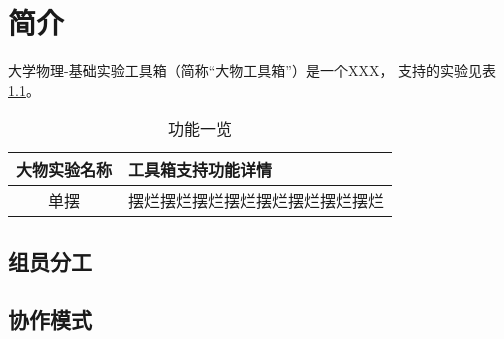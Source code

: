 
\chapter{简介}

大学物理-基础实验工具箱（简称``大物工具箱''）是一个XXX，
支持的实验见表 \ref{tab:func}。

\begin{table}[htbp]
  \centering
  \caption{功能一览}
  \label{tab:func}
  \begin{tabular}{cl}
    \toprule
    大物实验名称 & 工具箱支持功能详情 \\
    \midrule
    单摆 & 摆烂摆烂摆烂摆烂摆烂摆烂摆烂摆烂 \\
    \bottomrule
  \end{tabular}
\end{table}

\section{组员分工}

\section{协作模式}